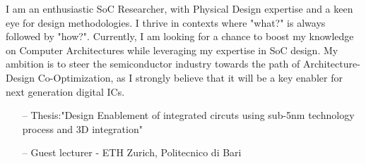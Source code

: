 \documentclass[10pt,a4paper,fancychapters]{altacv}
\begin{document}
%

\begin{fullwidth}
\makecvheader
{}
\justify 
\small{I am an enthusiastic SoC Researcher, with Physical Design expertise and a keen eye for design methodologies. I thrive in contexts where "what?" is always followed by "how?". Currently, I am looking for a chance to boost my knowledge on Computer Architectures while leveraging my expertise in SoC design. My ambition is to steer the semiconductor industry towards the path of  Architecture-Design Co-Optimization, as I strongly believe that it will be a key enabler for next generation digital ICs.}
\end{fullwidth}

%




\begin{itemize}
    \setlength{\itemindent}{0.5em}
    \item[--] \small{Thesis:"Design Enablement of integrated circuts using sub-5nm technology process and 3D integration"}
    \item[--] \small{Guest lecturer - ETH Zurich, Politecnico di Bari} 
\end{itemize}
\medskip


\end{document}

